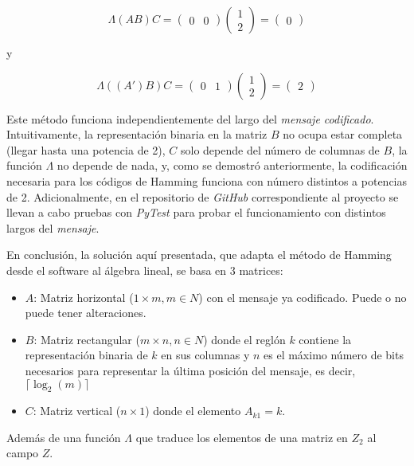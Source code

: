 \documentclass{article}
\begin{document}
$$
\Lambda(AB)C = \begin{pmatrix}
    0 & 0
\end{pmatrix}
\begin{pmatrix}
    1 \\ 2
\end{pmatrix}
= \begin{pmatrix}
    0
\end{pmatrix}
$$
\begin{center}
    y
\end{center}
$$
\Lambda((A')B)C = \begin{pmatrix}
    0 & 1
\end{pmatrix}
\begin{pmatrix}
    1 \\ 2
\end{pmatrix}
= \begin{pmatrix}
    2
\end{pmatrix}
$$

Este método funciona independientemente del largo del \textit{mensaje codificado}. Intuitivamente, la representación binaria en la matriz $B$ no ocupa estar completa (llegar hasta una potencia de 2), $C$ solo depende del número de columnas de $B$, la función $\Lambda$ no depende de nada, y, como se demostró anteriormente, la codificación necesaria para los códigos de Hamming funciona con número distintos a potencias de 2. Adicionalmente, en el repositorio de \textit{GitHub} correspondiente al proyecto se llevan a cabo pruebas con \textit{PyTest} para probar el funcionamiento con distintos largos del \textit{mensaje}. 

En conclusión, la solución aquí presentada, que adapta el método de Hamming desde el software al álgebra lineal, se basa en 3 matrices:
\begin{itemize}
    \item $A$: Matriz horizontal ($1 \times m, m \in N$) con el mensaje ya codificado. Puede o no puede tener alteraciones.
    \item $B$: Matriz rectangular ($m \times n, n \in N$) donde el reglón $k$ contiene la representación binaria de $k$ en sus columnas y $n$ es el máximo número de bits necesarios para representar la última posición del mensaje, es decir, $\lceil \log_2 (m) \rceil$
    \item $C$: Matriz vertical ($n \times 1$) donde el elemento $A_{k1} = k$.
\end{itemize}
Además de una función $\Lambda$ que traduce los elementos de una matriz en $Z_2$ al campo $Z$.
\end{document}
